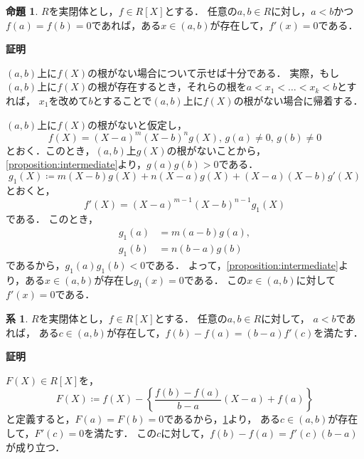 \documentclass[uplatex, dvipdfmx]{jsarticle}
\makeatletter
\numberwithin{equation}{section}
\renewenvironment{proof}[1][\proofname]{\par
  \pushQED{\qed}%
  \normalfont \topsep6\p@\@plus6\p@\relax
  \trivlist
  \item\relax
  {\bfseries
  #1\@addpunct{.}}\hspace\labelsep\ignorespaces
}{
  \popQED\endtrivlist\@endpefalse
}
\theoremstyle{definition}
\newtheorem{proposition}[definition]{命題}
\newtheorem{corollary}[definition]{系}
\renewcommand{\proofname}{\textbf{証明}}
\makeatother
\begin{document}
\begin{proposition}\label{proposition:Rolle}
     $R$を実閉体とし，$f \in R[X]$とする．
     任意の$a, b \in R$に対し，$a<b$かつ
     $f(a)=f(b)=0$であれば，ある$x \in (a,b)$が存在して，$f'(x)=0$である．
\end{proposition}
\begin{proof}
     $(a,b)$上に$f(X)$の根がない場合について示せば十分である．
     実際，もし$(a,b)$上に$f(X)$の根が存在するとき，それらの根を$a < x_1 < \dots < x_k < b$とすれば，
     $x_1$を改めて$b$とすることで$(a,b)$上に$f(X)$の根がない場合に帰着する．

     $(a,b)$上に$f(X)$の根がないと仮定し，
     \begin{equation}
     f(X) = (X-a)^m(X-b)^ng(X), \, g(a)\neq0,\, g(b)\neq0
     \end{equation}
     とおく．このとき，$(a,b)$上$g(X)$の根がないことから，\cref{proposition:intermediate}より，$g(a)g(b)>0$である．
     \begin{equation}
     g_1(X) \coloneqq m(X-b)g(X)+n(X-a)g(X)+(X-a)(X-b)g'(X)
     \end{equation}
     とおくと，
     \begin{equation}
          f'(X) = (X-a)^{m-1}(X-b)^{n-1}g_1(X)
     \end{equation}
     である．
     このとき，
     \begin{align}
     g_1(a) &= m(a-b)g(a), \\
     g_1(b) &= n(b-a)g(b)
     \end{align}
     であるから，$g_1(a)g_1(b)<0$である．
     よって，\cref{proposition:intermediate}より，ある$x \in (a, b)$が存在し$g_1(x)=0$である．
     この$x \in (a,b)$に対して$f'(x)=0$である．
\end{proof}

\begin{corollary}\label{corollary:mean-value}
     $R$を実閉体とし，$f \in R[X]$とする．
     任意の$a, b \in R$に対して，
     $a<b$であれば，
     ある$c \in (a,b)$が存在して，$f(b)-f(a) = (b-a)f'(c)$を満たす．
\end{corollary}

\begin{proof}
     $F(X) \in R[X]$を，
     \begin{equation}
          F(X) \coloneqq f(X) - \left\{\frac{f(b)-f(a)}{b-a}(X-a) + f(a)\right\}
     \end{equation}
     と定義すると，$F(a)=F(b)=0$であるから，\cref{proposition:Rolle}より，
     ある$c \in (a,b)$が存在して，$F'(c)=0$を満たす．
     この$c$に対して，$f(b)-f(a)=f'(c)(b-a)$が成り立つ．
\end{proof}
\end{document}

